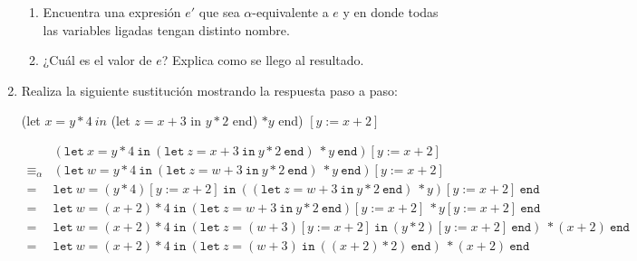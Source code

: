 \documentclass{article}
\begin{document}
\begin{enumerate}
{\begin{enumerate}
{        	}
        	\item{
        	Encuentra una expresión $e'$ que sea $\alpha$-equivalente a $e$ y en donde todas las variables ligadas tengan distinto nombre.\\
        	
        	}
        	\item {
        	¿Cuál es el valor de $e$? Explica como se llego al resultado.\\
        	
        	}
            \end{enumerate}
        }
    	\item {
    	Realiza la siguiente sustitución mostrando la respuesta paso a paso:
    	
        (let  $x = y \ast 4 \ in$ (let $z = x + 3$  in  $y \ast 2$ end) $\ast y $ end) $[y := x + 2]$
        
        \begin{align*}
            &(\texttt{let} \ x = y \ast 4 \ \texttt{in} \ 
            (\texttt{let} \ z = x + 3 \ \texttt{in} \ 
            y \ast 2 \ \texttt{end}) \ \ast y \ \texttt{end}) 
            [y := x + 2] \\
            \equiv_{\alpha}
            & (\texttt{let} \ w = y \ast 4 \ \texttt{in} \ 
            (\texttt{let} \ z = w + 3 \ \texttt{in} \ 
            y \ast 2 \ \texttt{end}) \ \ast y \ \texttt{end}) 
            [y := x + 2] \\
            =
            & \texttt{let} \ w = (y \ast 4)[y := x + 2] \ \texttt{in} \ 
            ((\texttt{let} \ z = w + 3 \ \texttt{in} \ 
            y \ast 2 \ \texttt{end}) \ \ast y) [y := x + 2] \ \texttt{end}
            \\
            =
            & \texttt{let} \ w = (x + 2) \ast 4 \ \texttt{in} \ 
            (\texttt{let} \ z = w + 3 \ \texttt{in} \ 
            y \ast 2 \ \texttt{end})[y := x + 2] \ \ast y [y := x + 2] \ 
            \texttt{end} \\
            =
            & \texttt{let} \ w = (x + 2) \ast 4 \ \texttt{in} \ 
            (\texttt{let} \ z = (w + 3) [y := x + 2] \ \texttt{in} \ 
            (y \ast 2 ) [y := x + 2]\ \texttt{end}) \ \ast (x + 2) \ 
            \texttt{end} \\
            =
            & \texttt{let} \ w = (x + 2) \ast 4 \ \texttt{in} \ 
            (\texttt{let} \ z = (w + 3) \ \texttt{in} \ 
            ((x + 2) \ast 2 ) \ \texttt{end}) \ \ast (x + 2) \ 
            \texttt{end} \\
        \end{align*}
    	
    	}
    \end{enumerate}
\end{document}
